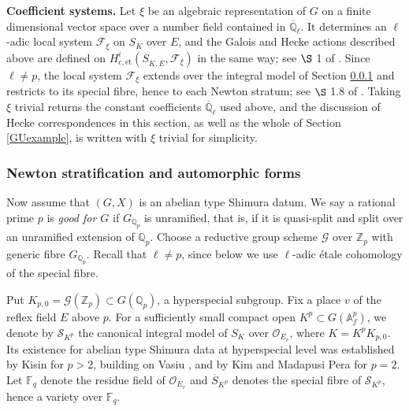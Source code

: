 \documentclass[11pt,a4paper]{article}
\theoremstyle{definition}
\theoremstyle{plain}
\theoremstyle{remark}
\theoremstyle{plain}
\begin{document}
\textbf{Coefficient systems.}
Let $\xi$ be an algebraic representation of $G$ on a finite dimensional vector space over a number field contained in $\overline{\mathbb{Q}}_\ell$. It determines an $\ell$-adic local system $\mathcal{F}_{\xi}$ on $S_K$ over $E$, and the Galois and Hecke actions described above are defined on $H^i_{c,\mathrm{et}}(S_{K,\overline{E}},\mathcal{F}_{\xi})$ in the same way; see $\S$ 1 of \cite{MR1044820}. Since $\ell \neq p$, the local system $\mathcal{F}_{\xi}$ extends over the integral model of Section \ref{newtonstratdetails} and restricts to its special fibre, hence to each Newton stratum; see $\S$ 1.8 of \cite{kisin2021stabletraceformulashimura}. Taking $\xi$ trivial returns the constant coefficients $\overline{\mathbb{Q}}_\ell$ used above, and the discussion of Hecke correspondences in this section, as well as the whole of Section \ref{GUexample}, is written with $\xi$ trivial for simplicity.

\subsubsection{Newton stratification and automorphic forms}\label{newtonstratdetails}
Now assume that $(G,X)$ is an abelian type Shimura datum. We say a rational prime $p$ is \textit{good for $G$} if $G_{\mathbb{Q}_p}$ is unramified, that is, if it is quasi-split and split over an unramified extension of $\mathbb{Q}_p$. Choose a reductive group scheme $\mathcal{G}$ over $\mathbb{Z}_p$ with generic fibre $G_{\mathbb{Q}_p}$. Recall that $\ell \neq p$, since below we use $\ell$-adic étale cohomology of the special fibre.

Put $K_{p,0} = \mathcal{G}(\mathbb{Z}_p) \subset G(\mathbb{Q}_p)$, a hyperspecial subgroup. Fix a place $v$ of the reflex field $E$ above $p$. For a sufficiently small compact open $K^p \subset G(\mathbb{A}_f^p)$, we denote by $\mathcal{S}_{K^p}$ the canonical integral model of $S_K$ over $\mathcal{O}_{E_v}$, where $K = K^p K_{p,0}$. Its existence for abelian type Shimura data at hyperspecial level was established by Kisin \cite{MR2669706} for $p>2$, building on Vasiu \cite{MR1796512}, and by Kim and Madapusi Pera \cite{MR3569319} for $p=2$. Let $\mathbb{F}_q$ denote the residue field of $\mathcal{O}_{E_v}$ and $\overline{S}_{K^p}$ denotes the special fibre of $\mathcal{S}_{K^p}$, hence a variety over $\mathbb{F}_q$.
\end{document}
